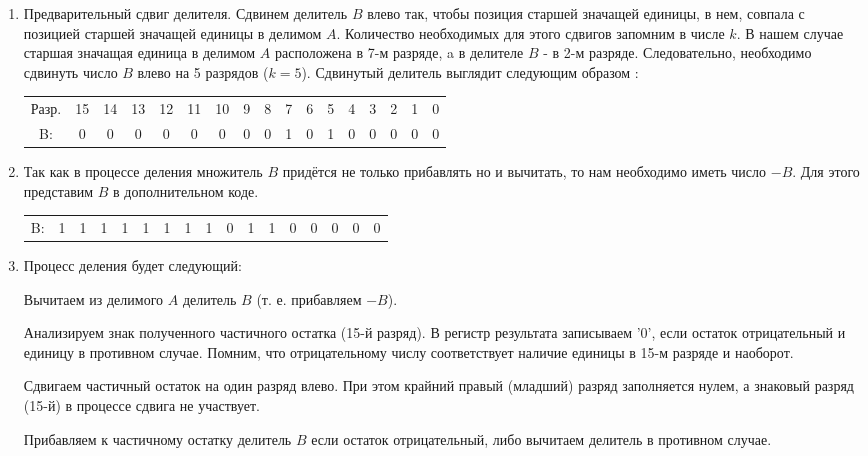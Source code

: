 \documentclass[12pt,a4paper]{scrartcl}
\begin{document}
\begin{enumerate}
	\item Предварительный сдвиг делителя. Сдвинем делитель $B$ влево так, чтобы позиция старшей значащей единицы, в нем, совпала с позицией старшей значащей единицы в делимом $A$. Количество необходимых для этого сдвигов запомним в числе $k$. В нашем случае старшая значащая единица в делимом $A$ расположена в 7-м разряде, a в делителе $B$ - в 2-м разряде. Следовательно, необходимо сдвинуть число $B$ влево на 5 разрядов ($k = 5$).
	Сдвинутый делитель выглядит следующим образом :
	
	\begin{table}[H]
		\centering
		\begin{tabular}{ccccccccccccccccc}
			Разр. & 15 & 14 & 13 & 12 & 11 & 10 & 9 & 8 & 7 & 6 & 5 & 4 & 3 & 2 & 1 & 0 \\
			B:    & 0  & 0  & 0  & 0  & 0  & 0  & 0 & 0 & 1 & 0 & 1 & 0 & 0 & 0 & 0 & 0
		\end{tabular}
	\end{table}
	
	\item Так как в процессе деления множитель $B$ придётся не только прибавлять но и вычитать, то нам необходимо иметь число $-B$. Для этого представим $B$ в дополнительном коде.
	
	\begin{table}[H]
		\centering
		\begin{tabular}{ccccccccccccccccc}
			B:    & 1  & 1  & 1  & 1  & 1  & 1  & 1 & 1 & 0 & 1 & 1 & 0 & 0 & 0 & 0 & 0
		\end{tabular}
	\end{table}
	
	\item Процесс деления будет следующий:
	
	\subitem Вычитаем из делимого $A$ делитель $B$ (т. е. прибавляем $-B$).
	
	\subitem Анализируем знак полученного частичного остатка (15-й разряд). В регистр результата записываем '0', если остаток отрицательный и единицу в противном случае. Помним, что отрицательному числу соответствует наличие единицы в 15-м разряде и наоборот.
	
	\subitem Сдвигаем частичный остаток на один разряд влево. При этом крайний правый (младший) разряд заполняется нулем, а знаковый разряд (15-й) в процессе сдвига не участвует.
	
	\subitem Прибавляем к частичному остатку делитель $B$ если остаток отрицательный, либо вычитаем делитель в противном случае.
	

\end{enumerate}
\end{document}
